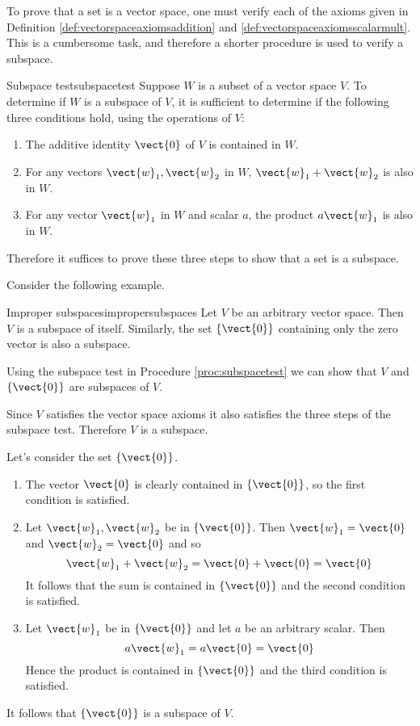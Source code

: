 To prove that a set is a vector space, one must verify each of the axioms given in Definition \ref{def:vectorspaceaxiomsaddition} and \ref{def:vectorspaceaxiomsscalarmult}. This is a cumbersome task, and therefore a shorter procedure is used to verify a subspace. 

\begin{procedure}{Subspace test}{subspacetest}
Suppose $W$ is a subset of a vector space $V$. To determine if $W$ is a subspace of $V$, it is sufficient to determine if the following three conditions hold, using the operations of $V$: 
\begin{enumerate}
\item
The additive identity $\vect{0}$ of $V$ is contained in $W$.
\item
For any vectors $\vect{w}_1, \vect{w}_2$ in $W$, $\vect{w}_1 + \vect{w}_2$ is also in $W$.
\item
For any vector $\vect{w}_1$ in $W$ and scalar $a$,  the product $a\vect{w}_1$ is also in $W$. 
\end{enumerate}
\end{procedure}

Therefore it suffices to prove these three steps to show that a set is a subspace. 

Consider the following example.

\begin{example}{Improper subspaces}{impropersubspaces}
Let $V$ be an arbitrary vector space. Then $V$ is a subspace of itself. Similarly, the set $\left\{ \vect{0} \right\}$ containing only the zero vector is also a subspace. 
\end{example}

\begin{solution}
Using the subspace test in Procedure \ref{proc:subspacetest} we can show that $V$ and $\left\{ \vect{0} \right\}$ are subspaces of $V$. 

Since $V$ satisfies the vector space axioms it also satisfies the three steps of the subspace test. Therefore $V$ is a subspace.

Let's consider the set $\left\{ \vect{0} \right\}$. 
\begin{enumerate}
\item
The vector $\vect{0}$ is clearly contained in  $\left\{ \vect{0} \right\}$, so the first condition is satisfied.

\item
Let $\vect{w}_1, \vect{w}_2$ be in  $\left\{ \vect{0} \right\}$. Then $\vect{w}_1 = \vect{0}$ and $\vect{w}_2 = \vect{0}$ and so 
\[
\vect{w}_1 + \vect{w}_2 = \vect{0} + \vect{0} = \vect{0}
\]
It follows that the sum is contained in $\left\{ \vect{0} \right\}$ and the second condition is satisfied. 

\item
Let $\vect{w}_1$ be in  $\left\{ \vect{0} \right\}$ and let $a$ be an arbitrary scalar. Then
\[
a\vect{w}_1  = a\vect{0} = \vect{0}
\]
Hence the product is contained in  $\left\{ \vect{0} \right\}$ and the third condition is satisfied. 
\end{enumerate}

It follows that  $\left\{ \vect{0} \right\}$ is a subspace of $V$. 
\end{solution}

